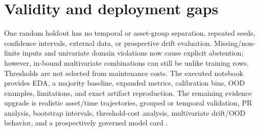\section{Validity and deployment gaps}
One random holdout has no temporal or asset-group separation, repeated seeds, confidence intervals, external data, or prospective drift evaluation. Missing/non-finite inputs and univariate domain violations now cause explicit abstention; however, in-bound multivariate combinations can still be unlike training rows. Thresholds are not selected from maintenance costs. The executed notebook provides EDA, a majority baseline, expanded metrics, calibration bins, OOD examples, limitations, and exact artifact reproduction. The remaining evidence upgrade is realistic asset/time trajectories, grouped or temporal validation, PR analysis, bootstrap intervals, threshold-cost analysis, multivariate drift/OOD behavior, and a prospectively governed model card \citep{mitchell2019modelcards}.
